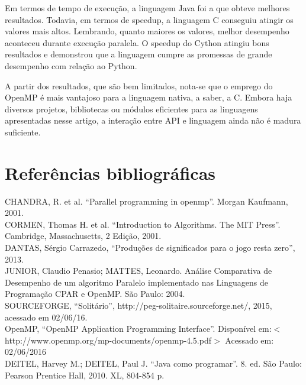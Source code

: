 \documentclass[a4paper,12pt]{article}
\begin{document}
Em termos de tempo de execução, a linguagem Java foi a que obteve melhores resultados. Todavia, em termos de speedup, a linguagem C conseguiu atingir os valores mais altos. Lembrando, quanto maiores os valores, melhor desempenho aconteceu durante execução paralela. O speedup do Cython atingiu bons resultados e demonstrou que a linguagem cumpre as promessas de grande desempenho com relação ao Python. 

A partir dos resultados, que são bem limitados, nota-se que o emprego do OpenMP é mais vantajoso para a linguagem nativa, a saber, a C. Embora haja diversos projetos, bibliotecas ou módulos eficientes para as linguagens apresentadas nesse artigo, a interação entre API e linguagem ainda não é madura suficiente.  

\section{Referências bibliográficas}
\noindent
\cite{1} CHANDRA, R. et al. “Parallel programming in openmp”. Morgan Kaufmann, 2001.\\
\hspace{0.5cm}
\cite{2} CORMEN, Thomas H. et al. “Introduction to Algorithms. The MIT Press”. Cambridge, Massachusetts, 2 Edição, 2001.\\
\hspace{0.5cm}
\cite{3} DANTAS, Sérgio Carrazedo, “Produções de significados para o jogo resta zero”, 2013. \\
\hspace{0.5cm}
\cite{4} JUNIOR, Claudio Penasio; MATTES, Leonardo. Análise Comparativa de Desempenho de um algoritmo Paralelo
implementado nas Linguagens de Programação CPAR e OpenMP. São Paulo: 2004. \\
\hspace{0.5cm}
\cite{5} SOURCEFORGE, “Solitário”, http://peg-solitaire.sourceforge.net/, 2015, acessado em 02/06/16.\\
\hspace{0.5cm}
\cite{6} OpenMP, “OpenMP Application Programming Interface”. Disponível em:$<$http://www.openmp.org/mp-documents/openmp-4.5.pdf$>$ Acessado em: 02/06/2016\\
\hspace{0.5cm}
\cite{7} DEITEL, Harvey M.; DEITEL, Paul J. “Java como programar”. 8. ed. São Paulo: Pearson Prentice Hall, 2010. XL, 804-854 p.\\



\end{document}
